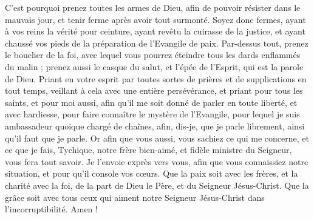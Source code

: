 \begin{multicols}{2}
C'est pourquoi prenez toutes les armes de Dieu, afin de pouvoir résister dans le mauvais jour, et tenir ferme après avoir tout surmonté.
Soyez donc fermes, ayant à vos reins la vérité pour ceinture, ayant revêtu la cuirasse de la justice,
et ayant chaussé vos pieds de la préparation de l’Evangile de paix.
Par-dessus tout, prenez le bouclier de la foi, avec lequel vous pourrez éteindre tous les dards enflammés du malin ;
prenez aussi le casque du salut, et l'épée de l'Esprit, qui est la parole de Dieu.
Priant en votre esprit par toutes sortes de prières et de supplications en tout temps, veillant à cela avec une entière persévérance, et priant pour tous les saints,
et pour moi aussi, afin qu'il me soit donné de parler en toute liberté, et avec hardiesse, pour faire connaître le mystère de l'Evangile,
pour lequel je suis ambassadeur quoique chargé de chaînes, afin, dis-je, que je parle librement, ainsi qu'il faut que je parle.
Or afin que vous aussi, vous sachiez ce qui me concerne, et ce que je fais, Tychique, notre frère bien-aimé, et fidèle ministre du Seigneur, vous fera tout savoir.
Je l'envoie exprès vers vous, afin que vous connaissiez notre situation, et pour qu'il console vos cœurs.
Que la paix soit avec les frères, et la charité avec la foi, de la part de Dieu le Père, et du Seigneur Jésus-Christ.
Que la grâce soit avec tous ceux qui aiment notre Seigneur Jésus-Christ dans l’incorruptibilité. Amen !
\PPE{}
\end{multicols}
